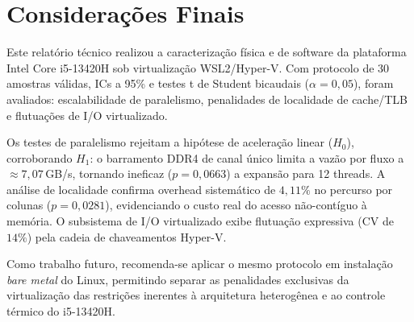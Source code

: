 \documentclass[
	12pt,
	openright,
	oneside,
	a4paper,
	english,
	brazil
	]{abntex2}
\begin{document}
\chapter{Considerações Finais}
\label{chap:conclusao}

Este relatório técnico realizou a caracterização física e de software da plataforma Intel Core i5-13420H sob virtualização WSL2/Hyper-V. Com protocolo de 30 amostras válidas, ICs a 95\% e testes t de Student bicaudais ($\alpha = 0{,}05$), foram avaliados: escalabilidade de paralelismo, penalidades de localidade de cache/TLB e flutuações de I/O virtualizado.

Os testes de paralelismo rejeitam a hipótese de aceleração linear ($H_0$), corroborando $H_1$: o barramento DDR4 de canal único limita a vazão por fluxo a $\approx 7{,}07$\,GB/s, tornando ineficaz ($p = 0{,}0663$) a expansão para 12 threads. A análise de localidade confirma overhead sistemático de $4{,}11\%$ no percurso por colunas ($p = 0{,}0281$), evidenciando o custo real do acesso não-contíguo à memória. O subsistema de I/O virtualizado exibe flutuação expressiva (CV de $14\%$) pela cadeia de chaveamentos Hyper-V.

Como trabalho futuro, recomenda-se aplicar o mesmo protocolo em instalação \textit{bare metal} do Linux, permitindo separar as penalidades exclusivas da virtualização das restrições inerentes à arquitetura heterogênea e ao controle térmico do i5-13420H.

\postextual


\end{document}
